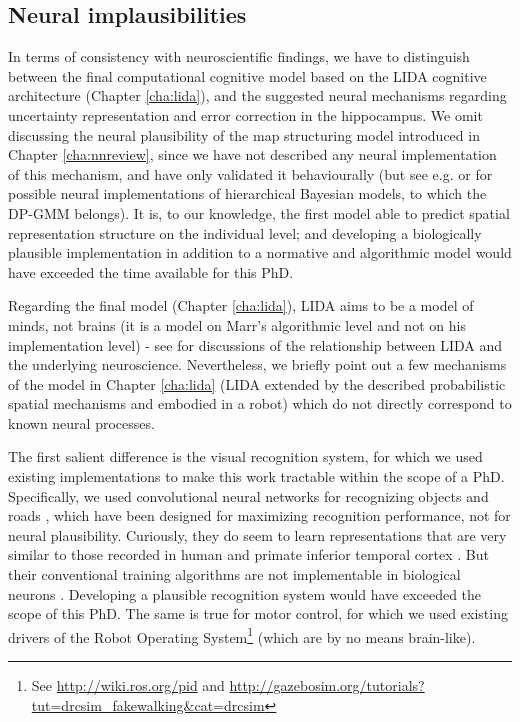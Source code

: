 \subsection{Neural implausibilities}

In terms of consistency with neuroscientific findings, we have to distinguish between the final computational cognitive model based on the LIDA cognitive architecture (Chapter \ref{cha:lida}), and the suggested neural mechanisms regarding uncertainty representation and error correction in the hippocampus. We omit discussing the neural plausibility of the map structuring model introduced in Chapter \ref{cha:nnreview}, since we have not described any neural implementation of this mechanism, and have only validated it behaviourally (but see e.g. \citep{shi2009neural} or \citep{sanborn2015types} for possible neural implementations of hierarchical Bayesian models, to which the DP-GMM belongs). It is, to our knowledge, the first model able to predict spatial representation structure on the individual level; and developing a biologically plausible implementation in addition to a normative and algorithmic model would have exceeded the time available for this PhD.

Regarding the final model (Chapter \ref{cha:lida}), LIDA aims to be a model of minds, not brains (it is a model on Marr's algorithmic level and not on his implementation level) - see \citep{franklin2012global, franklin2013lida} for discussions of the relationship between LIDA and the underlying neuroscience. Nevertheless, we briefly point out a few mechanisms of the model in Chapter \ref{cha:lida} (LIDA extended by the described probabilistic spatial mechanisms and embodied in a robot) which do not directly correspond to known neural processes. 

The first salient difference is the visual recognition system, for which we used existing implementations to make this work tractable within the scope of a PhD. Specifically, we used convolutional neural networks for recognizing objects \citep{szegedy2014going} and roads \citep{brust2015convolutional}, which have been designed for maximizing recognition performance, not for neural plausibility. Curiously, they do seem to learn representations that are very similar to those recorded in human and primate inferior temporal cortex \citep{khaligh2014deep, yamins2013hierarchical}. But their conventional training algorithms are not implementable in biological neurons \citep{stork1989backpropagation, bengio2015towards}. Developing a plausible recognition system would have exceeded the scope of this PhD. The same is true for motor control, for which we used existing drivers of the Robot Operating System\footnote{See \url{http://wiki.ros.org/pid} and \url{http://gazebosim.org/tutorials?tut=drcsim_fakewalking&cat=drcsim}} (which are by no means brain-like).

